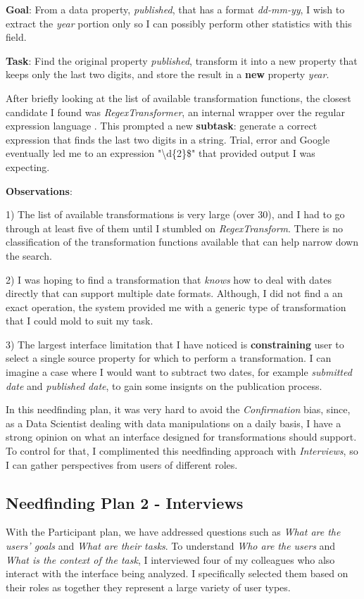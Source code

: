 \documentclass[12pt,letterpaper]{article}
\begin{document}
\textbf{Goal}: From a data property, \textit{published}, that has a format \textit{dd-mm-yy}, I wish to extract the \textit{year} portion only so I can possibly perform other statistics with this field. 

\textbf{Task}: Find the original property \textit{published}, transform it into a new property that keeps only the last two digits, and store the result in a \textbf{new} property \textit{year}.

After briefly looking at the list of available transformation functions, the closest candidate I found was \textit{RegexTransformer}, an internal wrapper over the regular expression language \cite{wiki:regex}. This prompted a new \textbf{subtask}: generate a correct expression that finds the last two digits in a string. Trial, error and Google eventually led me to an expression "{\textbackslash{d}\{2\}\$}" that provided output I was expecting.

\textbf{Observations}:

1) The list of available transformations is very large (over 30), and I had to go through at least five of them until I stumbled on \textit{RegexTransform}. There is no classification of the transformation functions available that can help narrow down the search.

2) I was hoping to find a transformation that \textit{knows} how to deal with dates directly that can support multiple date formats. Although, I did not find a an exact operation, the system provided me with a generic type of transformation that I could mold to suit my task.

3) The largest interface limitation that I have noticed is \textbf{constraining} user to select a single source property for which to perform a transformation. I can imagine a case where I would want to subtract two dates, for example \textit{submitted date} and \textit{published date}, to gain some insignts on the publication process.

In this needfinding plan, it was very hard to avoid the \textit{Confirmation} bias, since, as a Data Scientist dealing with data manipulations on a daily basis, I have a strong opinion on what an interface designed for transformations should support. To control for that, I complimented this needfinding approach with \textit{Interviews}, so I can gather perspectives from users of different roles. 

\subsection*{Needfinding Plan 2 - Interviews}
With the Participant plan, we have addressed questions such as \textit{What are the users' goals} and \textit{What are their tasks}. To understand \textit{Who are the users} and \textit{What is the context of the task}, I interviewed four of my colleagues who also interact with the interface being analyzed. I specifically selected them based on their roles as together they represent a large variety of user types. 
\end{document}
